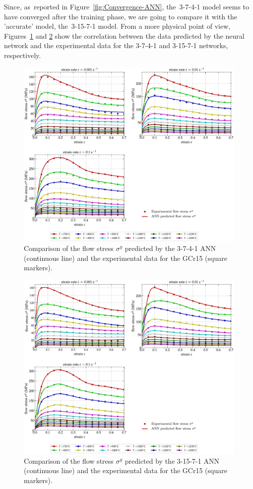 \documentclass[algorithms,article,accept,pdftex,moreauthors]{Definitions/mdpi}
\begin{document}
Since, as~reported in Figure~\ref{fig:Convergence-ANN}, the~3-7-4-1 model seems to have converged after the training phase, we are going to compare it with the 'accurate' model, the~3-15-7-1 model.
From a more physical point of view, Figures~\ref{fig:CompExpANN-9-4} and \ref{fig:CompExpANN-15-7} show the correlation between the data predicted by the neural network and the experimental data for the 3-7-4-1 and 3-15-7-1 networks, respectively.
\begin{figure}[H]
\includegraphics[width=0.9\columnwidth]{Figures/CompExpANN-3-7-4-1}
\caption{Comparison of the flow stress $\sigma^y$ predicted by the 3-7-4-1 ANN (continuous line) and the experimental data for the GCr15 (square markers).}
\label{fig:CompExpANN-9-4}
\end{figure}
\unskip
\begin{figure}[H]
\includegraphics[width=0.9\columnwidth]{Figures/CompExpANN-3-15-7-1}
\caption{Comparison of the flow stress $\sigma^y$ predicted by the 3-15-7-1 ANN (continuous line) and the experimental data for the GCr15 (square markers).}
\label{fig:CompExpANN-15-7}
\end{figure}
\end{document}
